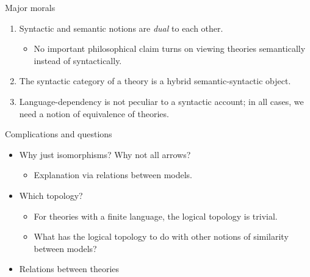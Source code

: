 \documentclass[8pt]{beamer}
\begin{document}
\begin{frame}{Major morals}

  \begin{enumerate} \addtolength{\itemsep}{\baselineskip}
\item Syntactic and semantic notions are \emph{dual} to each other.
  \begin{itemize}
  \item No important philosophical claim turns on viewing theories
    semantically instead of syntactically.
\end{itemize}
\item The syntactic category of a theory is a hybrid
  semantic-syntactic object.
\item Language-dependency is not peculiar to a syntactic account; in
  all cases, we need a notion of equivalence of theories.
\end{enumerate}
\end{frame}




\begin{frame}{Complications and questions}

\begin{itemize} 
\item Why just isomorphisms?  Why not all arrows?
\smallskip
\begin{itemize}
\item Explanation via relations between models.
\end{itemize}
\bigskip
\item Which topology?  
\smallskip
\begin{itemize} 
\item For theories with a finite language, the logical topology is
  trivial.
\item What has the logical topology to do with other notions of
  similarity between models?
\end{itemize}
\bigskip
\item Relations between theories
\end{itemize}


\end{frame}
\end{document}
